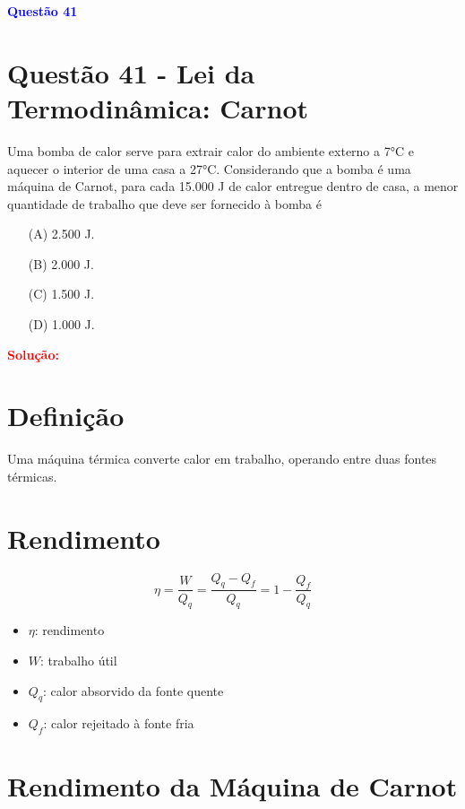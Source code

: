 \documentclass[a4paper,12pt]{article}
\begin{document}
\begin{flushleft}
\textbf{\textcolor{blue}{\Large Quest\~ao 41}}\\
\noindent
\section{Quest\~ao 41 - Lei da Termodinâmica: Carnot}
Uma bomba de calor serve para extrair calor do ambiente
externo a 7°C e aquecer o interior de uma casa a 27°C.
Considerando que a bomba é uma máquina de Carnot, para
cada 15.000 J de calor entregue dentro de casa, a menor
quantidade de trabalho que deve ser fornecido à bomba é

\begin{itemize}
\item[(A)] 2.500 J.
\item[(B)] 2.000 J.
\item[(C)] 1.500 J.
\item[(D)] 1.000 J.
\end{itemize}

\vspace{0.5cm}

\textcolor{red}{\textbf{Solução:}}\\

\section*{Definição}

Uma máquina térmica converte calor em trabalho, operando entre duas fontes térmicas.

\section*{Rendimento}

\[
\eta = \frac{W}{Q_q} = \frac{Q_q - Q_f}{Q_q} = 1 - \frac{Q_f}{Q_q}
\]

\begin{itemize}
  \item \( \eta \): rendimento
  \item \( W \): trabalho útil
  \item \( Q_q \): calor absorvido da fonte quente
  \item \( Q_f \): calor rejeitado à fonte fria
\end{itemize}

\section*{Rendimento da Máquina de Carnot}


\end{flushleft}
\end{document}
